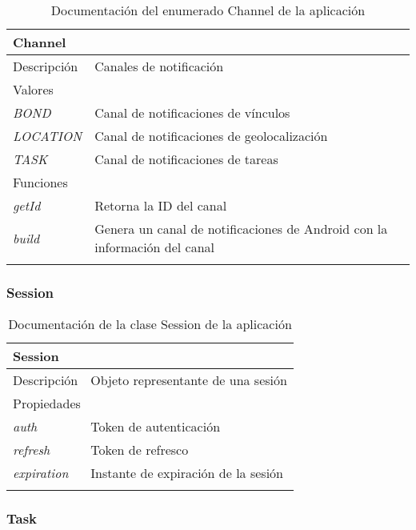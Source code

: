 \newpage
\begin{longtable}{|p{} p{}|}
    \hline
    \multicolumn{2}{|l|}{\textbf{Channel}} \\ \hline \hline
    Descripción      & Canales de notificación \\ \hline
    \multicolumn{2}{|l|}{Valores} \\
    \emph{BOND}  & Canal de notificaciones de vínculos  \\
    \emph{LOCATION}  & Canal de notificaciones de geolocalización  \\
    \emph{TASK}  & Canal de notificaciones de tareas  \\  \hline
    \multicolumn{2}{|l|}{Funciones} \\
    \emph{getId} & Retorna la ID del canal \\
    \emph{build}  & Genera un canal de notificaciones de Android con la información del canal \\  \hline
    \caption{Documentación del enumerado Channel de la aplicación}
    \label{dis:app:channel}
\end{longtable}

\vspace{-30pt}
\subsubsection{Session}

\begin{longtable}{|p{} p{}|}
    \hline
    \multicolumn{2}{|l|}{\textbf{Session}} \\ \hline \hline
    Descripción      & Objeto representante de una sesión \\ \hline
    \multicolumn{2}{|l|}{Propiedades} \\
    \emph{auth}  & Token de autenticación \\
    \emph{refresh}  & Token de refresco \\
    \emph{expiration}  & Instante de expiración de la sesión \\  \hline
    \caption{Documentación de la clase Session de la aplicación}
    \label{dis:app:session}
\end{longtable}

\vspace{-20pt}
\subsubsection{Task}

